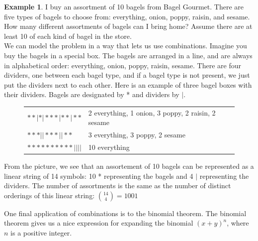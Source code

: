 \documentclass[12pt]{article}
\theoremstyle{definition}
\newtheorem*{example}{Example}
\theoremstyle{remark}
\begin{document}
\begin{example}
I buy an assortment of 10 bagels from Bagel Gourmet. There are five types of bagels to choose from: everything, onion, poppy, raisin, and sesame. How many different assortments of bagels can I bring home? Assume there are at least 10 of each kind of bagel in the store.\\

We can model the problem in a way that lets us use combinations. Imagine you buy the bagels in a special box. The bagels are arranged in a line, and are always in alphabetical order: everything, onion, poppy, raisin, sesame. There are four dividers, one between each bagel type, and if a bagel type is not present, we just put the dividers next to each other. Here is an example of three bagel boxes with their dividers. Bagels are designated by * and dividers by $|$.
\begin{figure}[H]
\begin{tabular}{ll}
$* * | * | * * * | * * | * *$ & 2 everything, 1 onion, 3 poppy, 2 raisin, 2 sesame \\
$* * * | | * * * | | * *$ & 3 everything, 3 poppy, 2 sesame\\
$* * * * * * * * * * | | | |$ & 10 everything\\
\end{tabular}
\end{figure}
From the picture, we see that an assortement of 10 bagels can be represented as a linear string of 14 symbols: 10 * representing the bagels and 4 $|$ representing the dividers. The number of assortments is the same as the number of distinct orderings of this linear string: $\binom{14}{4} = 1001$
\end{example}

One final application of combinations is to the binomial theorem. The binomial theorem gives us a nice expression for expanding the binomial $(x+y)^n$, where $n$ is a positive integer.
\end{document}
